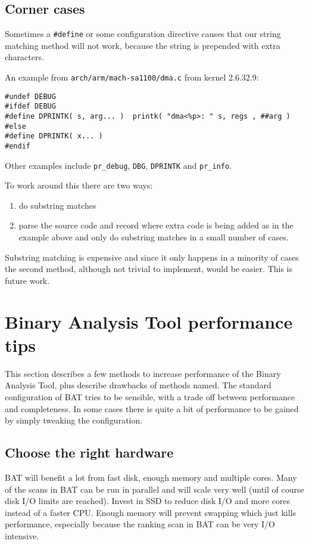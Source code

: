 \documentclass[10pt,a4paper]{article}
\begin{document}
\subsection{Corner cases}

Sometimes a \texttt{\#define} or some configuration directive causes that our 
string matching method will not work, because the string is prepended with
extra characters.

An example from \texttt{arch/arm/mach-sa1100/dma.c} from kernel 2.6.32.9:

\begin{verbatim}
#undef DEBUG
#ifdef DEBUG
#define DPRINTK( s, arg... )  printk( "dma<%p>: " s, regs , ##arg )
#else
#define DPRINTK( x... )
#endif
\end{verbatim}

Other examples include \texttt{pr\_debug}, \texttt{DBG}, \texttt{DPRINTK} and
\texttt{pr\_info}.

To work around this there are two ways:

\begin{enumerate}
\item do substring matches
\item parse the source code and record where extra code is being added as in
the example above and only do substring matches in a small number of cases.
\end{enumerate}

Substring matching is expensive and since it only happens in a minority of
cases the second method, although not trivial to implement, would be easier.
This is future work.

\section{Binary Analysis Tool performance tips}

This section describes a few methods to increase performance of the Binary
Analysis Tool, plus describe drawbacks of methods named. The standard
configuration of BAT tries to be sensible, with a trade off between performance
and completeness. In some cases there is quite a bit of performance to be
gained by simply tweaking the configuration.

\subsection{Choose the right hardware}

BAT will benefit a lot from fast disk, enough memory and multiple cores. Many
of the scans in BAT can be run in parallel and will scale very well (until
of course disk I/O limits are reached). Invest in SSD to reduce disk I/O and
more cores instead of a faster CPU. Enough memory will prevent swapping which
just kills performance, especially because the ranking scan in BAT can be very
I/O intensive.
\end{document}
